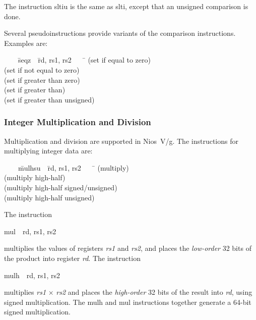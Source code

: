 \documentclass[11pt, twoside, pdftex]{article}
\newenvironment{ctabbing}%
{\begin{center}\begin{minipage}{\textwidth}\begin{tabbing}}
{\end{tabbing}\end{minipage}\end{center}}
\begin{document}
The instruction {\sf sltiu} is the same as {\sf slti}, except that an unsigned comparison
is done.

Several pseudoinstructions provide variants of the comparison instructions. Examples are:
\vspace{-\baselineskip}
\begin{ctabbing}
~~~~\={\sf seqz}~~\={\sf rd, rs1, rs2}~~~~\=\kill
{}  \>(set if equal to zero)\\
  \>(set if not equal to zero)\\
  \>(set if greater than zero)\\
  \>(set if greater than)\\
  \>(set if greater than unsigned)\\
\end{ctabbing}

\subsubsection{Integer Multiplication and Division}

Multiplication and division are supported in Nios~V/g. The instructions for multiplying 
integer data are:
\vspace{-\baselineskip}
\begin{ctabbing}
~~~~\={\sf mulhsu}~~\={\sf rd, rs1, rs2}~~~~\=\kill
{} \>(multiply)\\
 \>(multiply high-half)\\
 \>(multiply high-half signed/unsigned)\\
 \>(multiply high-half unsigned)
\end{ctabbing}

\noindent
The instruction
\vspace{-\baselineskip}
\begin{center}
{\sf mul~~rd, rs1, rs2}
\end{center}
\noindent
multiplies the values of registers {\it rs1} and {\it rs2}, and places the {\it low-order}
32 bits of the product into register {\it rd}.  The instruction
\vspace{-\baselineskip}
\begin{center}
{\sf mulh~~rd, rs1, rs2}
\end{center}
\noindent
multiplies {\it rs1} $\times$ {\it rs2} and places the {\it high-order} 32 bits of the result 
into {\it rd}, using signed multiplication. The {\sf mulh} and {\sf mul} instructions
together generate a 64-bit signed multiplication.
 
\end{document}

